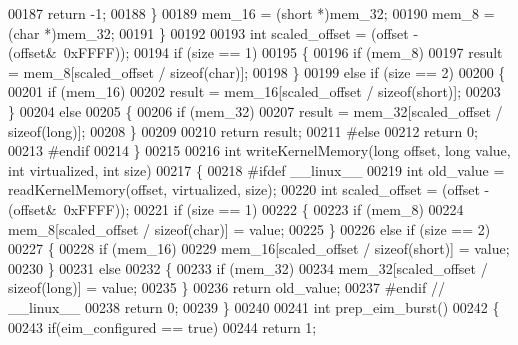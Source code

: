 \begin{DoxyCode}
{{{{00187             \textcolor{keywordflow}{return} -1;
00188         \}
00189         mem\_16 = (\textcolor{keywordtype}{short} *)mem\_32;
00190         mem\_8 = (\textcolor{keywordtype}{char} *)mem\_32;
00191     \}
00192 
00193     \textcolor{keywordtype}{int} scaled\_offset = (offset - (offset&~0xFFFF));
00194     \textcolor{keywordflow}{if} (size == 1)
00195     \{
00196         \textcolor{keywordflow}{if} (mem\_8)
00197             result = mem\_8[scaled\_offset / \textcolor{keyword}{sizeof}(char)];
00198     \}
00199     \textcolor{keywordflow}{else} \textcolor{keywordflow}{if} (size == 2)
00200     \{
00201         \textcolor{keywordflow}{if} (mem\_16)
00202             result = mem\_16[scaled\_offset / \textcolor{keyword}{sizeof}(short)];
00203     \}
00204     \textcolor{keywordflow}{else}
00205     \{
00206         \textcolor{keywordflow}{if} (mem\_32)
00207             result = mem\_32[scaled\_offset / \textcolor{keyword}{sizeof}(long)];
00208     \}
00209 
00210     \textcolor{keywordflow}{return} result;
00211 \textcolor{preprocessor}{#else}
00212     \textcolor{keywordflow}{return} 0;
00213 \textcolor{preprocessor}{#endif}
00214 \}
00215 
00216 \textcolor{keywordtype}{int} writeKernelMemory(\textcolor{keywordtype}{long} offset, \textcolor{keywordtype}{long} value, \textcolor{keywordtype}{int} virtualized, \textcolor{keywordtype}{int} size)
00217 \{
00218 \textcolor{preprocessor}{#ifdef \_\_linux\_\_}
00219     \textcolor{keywordtype}{int} old\_value = readKernelMemory(offset, virtualized, size);
00220     \textcolor{keywordtype}{int} scaled\_offset = (offset - (offset&~0xFFFF));
00221     \textcolor{keywordflow}{if} (size == 1)
00222     \{
00223         \textcolor{keywordflow}{if} (mem\_8)
00224             mem\_8[scaled\_offset / \textcolor{keyword}{sizeof}(char)] = value;
00225     \}
00226     \textcolor{keywordflow}{else} \textcolor{keywordflow}{if} (size == 2)
00227     \{
00228         \textcolor{keywordflow}{if} (mem\_16)
00229             mem\_16[scaled\_offset / \textcolor{keyword}{sizeof}(short)] = value;
00230     \}
00231     \textcolor{keywordflow}{else}
00232     \{
00233         \textcolor{keywordflow}{if} (mem\_32)
00234             mem\_32[scaled\_offset / \textcolor{keyword}{sizeof}(long)] = value;
00235     \}
00236     \textcolor{keywordflow}{return} old\_value;
00237 \textcolor{preprocessor}{#endif // \_\_linux\_\_}
00238     \textcolor{keywordflow}{return} 0;
00239 \}
00240 
00241 \textcolor{keywordtype}{int} prep_eim_burst()
00242 \{
00243     \textcolor{keywordflow}{if}(eim_configured == \textcolor{keyword}{true})
00244         \textcolor{keywordflow}{return} 1;
}}}}
\end{DoxyCode}
